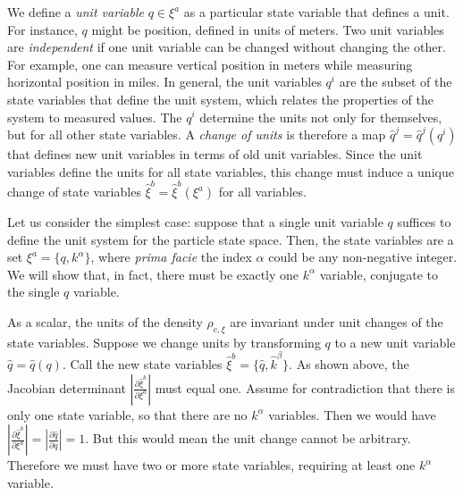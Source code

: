 \documentclass[12pt, english, twoside]{article} %
\begin{document}
We define a \textit{unit variable} $q \in \xi^a$ as a particular state variable that defines a unit. For instance, $q$ might be position, defined in units of meters. Two unit variables are \textit{independent} if one unit variable can be changed without changing the other. For example, one can measure vertical position in meters while measuring horizontal position in miles.  In general, the unit variables $q^i$ are the subset of the state variables that define the unit system, which relates the properties of the system to measured values. The $q^i$ determine the units not only for themselves, but for all other state variables. A \textit{change of units} is therefore a map $\hat{q}^j = \hat{q}^j(q^i)$ that defines new unit variables in terms of old unit variables. Since the unit variables define the units for all state variables, this change must induce a unique change of state variables $\hat{\xi}^b = \hat{\xi}^b(\xi^a)$ for all variables.

Let us consider the simplest case: suppose that a single unit variable $q $ suffices to define the unit system for the particle state space. Then, the state variables are a set $\xi^a = \{ q, k^\alpha \}$, where \textit{prima facie} the index $\alpha$ could be any non-negative integer. We will show that, in fact, there must be exactly one $k^\alpha$ variable, conjugate to the single $q$ variable. 

As a scalar, the units of the density $\rho_{c, \xi}$ are invariant under unit changes of the state variables. Suppose we change units by transforming $q$ to a new unit variable $\hat{q}=\hat{q}(q)$. Call the new state variables $\hat{\xi}^b = \{ \hat{q}, \hat{k}^\beta\}$. As shown above, the Jacobian determinant $\left|\frac{\partial \hat{\xi}^b}{\partial \xi^a} \right|$ must equal one. Assume for contradiction that there is only one state variable, so that there are no $k^\alpha$ variables. Then we would have $\left|\frac{\partial \hat{\xi}^b}{\partial \xi^a} \right| = \left|\frac{\partial \hat q}{\partial q} \right| = 1$. But this would mean the unit change cannot be arbitrary. Therefore we must have two or more state variables, requiring at least one $k^\alpha$ variable. 
\end{document}
